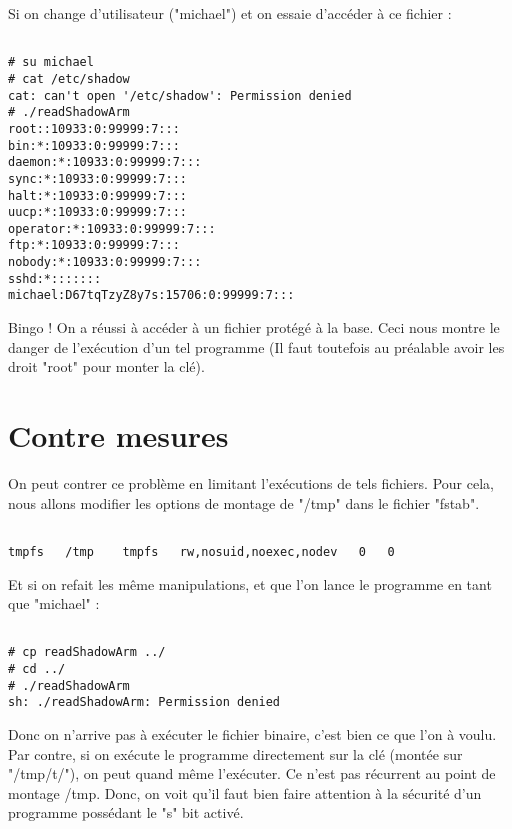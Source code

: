 Si on change d'utilisateur ("michael") et on essaie d'accéder à ce fichier :
\begin{lstlisting}[frame=single,style=Bash]  % Start your code-block

# su michael
# cat /etc/shadow
cat: can't open '/etc/shadow': Permission denied
# ./readShadowArm
root::10933:0:99999:7:::
bin:*:10933:0:99999:7:::
daemon:*:10933:0:99999:7:::
sync:*:10933:0:99999:7:::
halt:*:10933:0:99999:7:::
uucp:*:10933:0:99999:7:::
operator:*:10933:0:99999:7:::
ftp:*:10933:0:99999:7:::
nobody:*:10933:0:99999:7:::
sshd:*:::::::
michael:D67tqTzyZ8y7s:15706:0:99999:7:::

\end{lstlisting}

Bingo ! On a réussi à accéder à un fichier protégé à la base. Ceci nous montre le danger de l'exécution d'un tel programme (Il faut toutefois au préalable avoir les droit "root" pour monter la clé).

\section{Contre mesures}
On peut contrer ce problème en limitant l'exécutions de tels fichiers. Pour cela, nous allons modifier les options de montage de "/tmp" dans le fichier "fstab".

\begin{lstlisting}[frame=single,style=Bash]  % Start your code-block

tmpfs   /tmp    tmpfs   rw,nosuid,noexec,nodev   0   0
\end{lstlisting}

Et si on refait les même manipulations, et que l'on lance le programme en tant que "michael" :
\begin{lstlisting}[frame=single,style=Bash]  % Start your code-block

# cp readShadowArm ../
# cd ../
# ./readShadowArm 
sh: ./readShadowArm: Permission denied
\end{lstlisting}

Donc on n'arrive pas à exécuter le fichier binaire, c'est bien ce que l'on à voulu. Par contre, si on exécute le programme directement sur la clé (montée sur "/tmp/t/"), on peut quand même l'exécuter. Ce n'est pas récurrent au point de montage /tmp. Donc, on voit qu'il faut bien faire attention à la sécurité d'un programme possédant le "s" bit activé.
